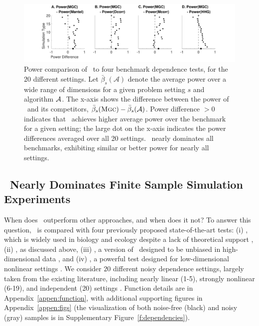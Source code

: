 \documentclass[11pt]{article}
\begin{document}
\begin{figure}[!ht]
  \centering
  \includegraphics[width=1.0\textwidth,trim={3.5cm 0 3.5cm 0cm},clip]{Figures/FigHDPowerMGCM}
  \caption{Power comparison of  \Mgc~to four benchmark dependence tests, for the $20$ different settings.  
Let $\bar{\beta}_s(\mathcal{A})$ denote the average power over a wide range of dimensions for a given problem setting $s$ and algorithm $\mathcal{A}$. The x-axis shows the difference between the power of \Mgc~and its competitors,  $\bar{\beta}_s({\normalfont\textsc{Mgc}})-\bar{\beta}_s(\mathcal{A})$. Power difference $>0$ indicates that \Mgc~achieves higher average power over the benchmark for a given setting;
the large dot on the x-axis indicates the  power differences averaged over all 20 settings.
\Mgc~nearly dominates all benchmarks, exhibiting similar or better power for nearly all settings. 
}
\label{f:nDSummary}
\end{figure}

\subsection*{\Mgc~Nearly Dominates Finite Sample Simulation Experiments}

When does \Mgc~outperform other approaches, and when does it not?
To answer this question, \Mgc~is compared with four previously proposed state-of-the-art tests: (i) \Mantel, which is widely used in biology and ecology despite a lack of theoretical support \cite{Mantel1967}, (ii) \Dcorr, as discussed above, (iii) \Mcorr, a version of \Dcorr~designed to be unbiased in high-dimensional data \cite{SzekelyRizzo2013a}, and (iv) \Hhg, a powerful test designed for low-dimensional nonlinear settings \cite{HellerGorfine2013}. 
We consider $20$ different noisy dependence settings, largely taken from the existing literature, including  nearly linear (1-5), strongly nonlinear (6-19), and independent (20) settings \cite{SzekelyRizzoBakirov2007, SimonTibshirani2012, GorfineHellerHeller2012, HellerGorfine2013, SzekelyRizzo2013a}.  
Function details are in Appendix~\ref{appen:function}, with additional supporting figures in Appendix~\ref{appen:figs} (the visualization of both noise-free (black) and noisy (gray) samples is in Supplementary Figure~\ref{f:dependencies}).  
\end{document}
